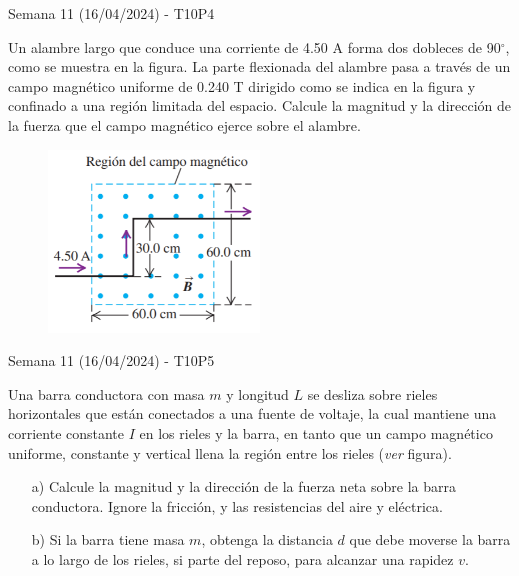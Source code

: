 \begin{frame}{Semana 11 (16/04/2024) - T10P4}

    Un alambre largo que
conduce una corriente de 4.50 A
forma dos dobleces de 90$^\circ$, como
se muestra en la figura.
La parte flexionada del alambre
pasa a través de un campo magnético uniforme de 0.240 T dirigido como se indica en la
figura y confinado a una región
limitada del espacio. Calcule 
la magnitud y la dirección de la
fuerza que el campo magnético
ejerce sobre el alambre.

\begin{figure}
    \centering
    \includegraphics[width=0.5\textwidth]{figures/t10p4.png}
\end{figure}
    
\end{frame}

\begin{frame}{Semana 11 (16/04/2024) - T10P5}

    Una barra conductora con masa $m$ y longitud $L$ se desliza sobre rieles horizontales que
están conectados a una fuente de voltaje, la cual mantiene una corriente constante $I$ en los rieles y la barra, en tanto que un campo magnético
uniforme, constante y vertical llena la región entre los rieles (\textit{ver} figura).

\begin{itemize}
    \item[a)] Calcule la magnitud y la dirección de la fuerza neta sobre
la barra conductora. Ignore la fricción, y las resistencias del aire y
eléctrica.
    \item[b)] Si la barra tiene masa $m$, obtenga la distancia $d$ que debe
moverse la barra a lo largo de los rieles, si parte del reposo, para alcanzar una rapidez $v$.
\end{itemize}
    
\end{frame}

